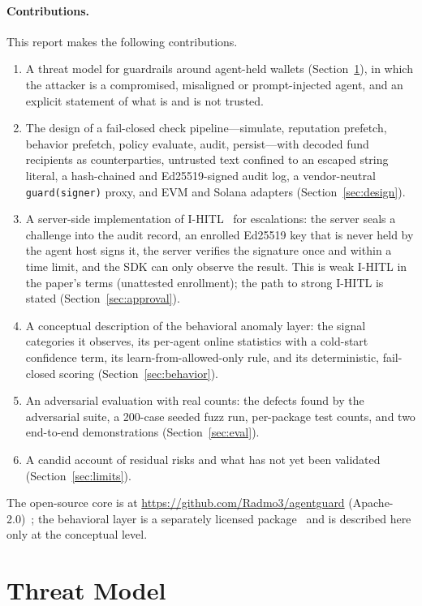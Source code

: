 \documentclass[10pt]{article}
\newcommand{\code}[1]{{\def\_{\char`\_\allowbreak}\texttt{#1}}}
\begin{document}
\paragraph{Contributions.} This report makes the following contributions.
\begin{enumerate}
  \item A threat model for guardrails around agent-held wallets (Section~\ref{sec:threat}), in which the attacker is a compromised, misaligned or prompt-injected agent, and an explicit statement of what is and is not trusted.
  \item The design of a fail-closed check pipeline---simulate, reputation prefetch, behavior prefetch, policy evaluate, audit, persist---with decoded fund recipients as counterparties, untrusted text confined to an escaped string literal, a hash-chained and Ed25519-signed audit log, a vendor-neutral \code{guard(signer)} proxy, and EVM and Solana adapters (Section~\ref{sec:design}).
  \item A server-side implementation of I-HITL~\cite{ihitl} for escalations: the server seals a challenge into the audit record, an enrolled Ed25519 key that is never held by the agent host signs it, the server verifies the signature once and within a time limit, and the SDK can only observe the result. This is weak I-HITL in the paper's terms (unattested enrollment); the path to strong I-HITL is stated (Section~\ref{sec:approval}).
  \item A conceptual description of the behavioral anomaly layer: the signal categories it observes, its per-agent online statistics with a cold-start confidence term, its learn-from-allowed-only rule, and its deterministic, fail-closed scoring (Section~\ref{sec:behavior}).
  \item An adversarial evaluation with real counts: the defects found by the adversarial suite, a 200-case seeded fuzz run, per-package test counts, and two end-to-end demonstrations (Section~\ref{sec:eval}).
  \item A candid account of residual risks and what has not yet been validated (Section~\ref{sec:limits}).
\end{enumerate}

The open-source core is at \url{https://github.com/Radmo3/agentguard} (Apache-2.0)~\cite{repo}; the behavioral layer is a separately licensed package~\cite{behrepo} and is described here only at the conceptual level.

\section{Threat Model}
\label{sec:threat}
\end{document}
